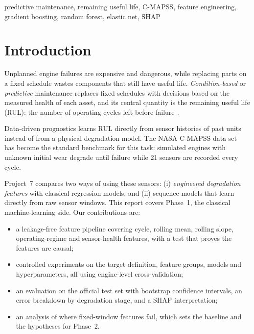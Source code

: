 \documentclass[conference]{IEEEtran}
\begin{document}
\begin{IEEEkeywords}
predictive maintenance, remaining useful life, C-MAPSS, feature engineering, gradient boosting, random forest, elastic net, SHAP
\end{IEEEkeywords}

\section{Introduction}
Unplanned engine failures are expensive and dangerous, while replacing parts on a fixed schedule wastes components that still have useful life. \emph{Condition-based} or \emph{predictive} maintenance replaces fixed schedules with decisions based on the measured health of each asset, and its central quantity is the remaining useful life (RUL): the number of operating cycles left before failure~\cite{lei2018review}.

Data-driven prognostics learns RUL directly from sensor histories of past units instead of from a physical degradation model. The NASA C-MAPSS data set~\cite{saxena2008damage,saxena2008dataset} has become the standard benchmark for this task: simulated engines with unknown initial wear degrade until failure while 21 sensors are recorded every cycle.

Project~7 compares two ways of using these sensors: (i) \emph{engineered degradation features} with classical regression models, and (ii) sequence models that learn directly from raw sensor windows. This report covers Phase~1, the classical machine-learning side. Our contributions are:
\begin{itemize}
  \item a leakage-free feature pipeline covering cycle, rolling mean, rolling slope, operating-regime and sensor-health features, with a test that proves the features are causal;
  \item controlled experiments on the target definition, feature groups, models and hyperparameters, all using engine-level cross-validation;
  \item an evaluation on the official test set with bootstrap confidence intervals, an error breakdown by degradation stage, and a SHAP interpretation;
  \item an analysis of where fixed-window features fail, which sets the baseline and the hypotheses for Phase~2.
\end{itemize}
\end{document}
